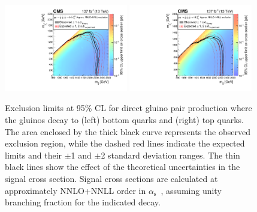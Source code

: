 \begin{figure}[htbp]
  \centering
    \includegraphics[width=0.48\textwidth]{figs/results/T1bbbbXSEC.pdf}
    \includegraphics[width=0.48\textwidth]{figs/results/T1ttttXSEC.pdf}
    \caption{
    Exclusion limits at  95\% CL for
     direct gluino pair production where the gluinos decay to (left) bottom quarks and (right) top quarks.
      The area enclosed by the thick black curve represents the observed exclusion region,
      while the dashed red lines indicate the expected limits and
      their $\pm$1 and $\pm$2
      standard deviation ranges.
      The thin black lines show the effect of the theoretical
      uncertainties in the signal cross section.
      Signal cross sections are calculated at approximately NNLO+NNLL order in $\alpha_{\mathrm{s}}$~\cite{Beenakker:nnll},
      assuming unity branching fraction for the indicated decay.}
    \label{fig:t1x}
\end{figure}

